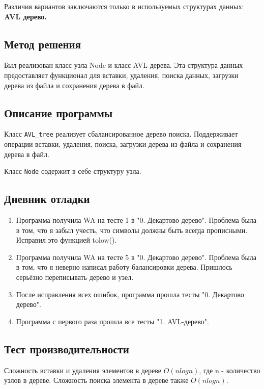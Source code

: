 \documentclass[12pt]{article}
\begin{document}
Различия вариантов заключаются только в используемых структурах данных:
\textbf{AVL дерево.}

\newpage
\subsection*{Метод решения}

Был реализован класс узла Node и класс AVL дерева. Эта структура данных предоставляет функционал для вставки, удаления, поиска данных, загрузки дерева из файла и сохранения дерева в файл.

\subsection*{Описание программы}

Класс \texttt{AVL\_tree} реализует сбалансированное дерево поиска. Поддерживает операции вставки, удаления, поиска, загрузки дерева из файла и сохранения дерева в файл.

Класс \texttt{Node} содержит в себе структуру узла.


\newpage
\subsection*{Дневник отладки}

\begin{enumerate}
    \item Программа получила WA на тесте 1 в  "0. Декартово дерево". Проблема была в том, что я забыл учесть, что символы должны быть всегда прописными. Исправил это функцией tolow().
    \item Программа получила WA на тесте 5 в  "0. Декартово дерево". Проблема была в том, что я неверно написал работу балансировки дерева. Пришлось серьёзно переписывать дерево и узел.
    \item После исправления всех ошибок, программа прошла тесты "0. Декартово дерево".
    \item Программа с первого раза прошла все тесты "1. AVL-дерево".
\end{enumerate}

\newpage
\subsection*{Тест производительности}

Сложность вставки и удаления элементов в дереве $O(n log n)$, где n - количество узлов в дереве.
Сложность поиска элемента в дереве также $O(n log n)$.
\end{document}
